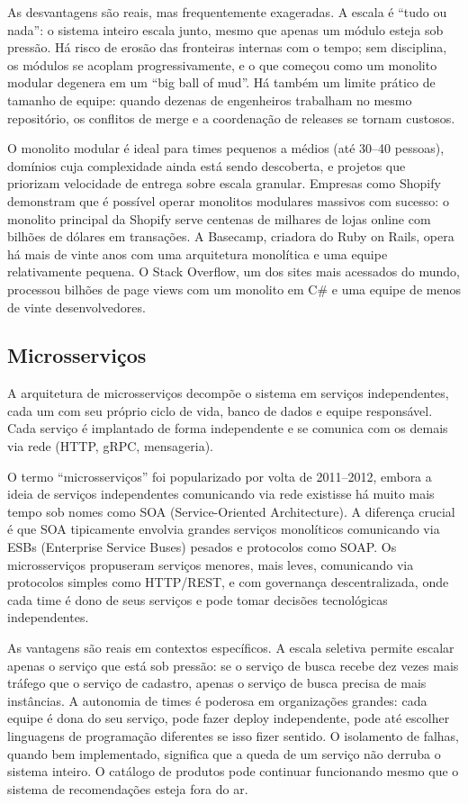 As desvantagens são reais, mas frequentemente exageradas. A escala é ``tudo
ou nada'': o sistema inteiro escala junto, mesmo que apenas um módulo esteja
sob pressão. Há risco de erosão das fronteiras internas com o tempo; sem
disciplina, os módulos se acoplam progressivamente, e o que começou como um
monolito modular degenera em um ``big ball of mud''. Há também um limite prático
de tamanho de equipe: quando dezenas de engenheiros trabalham no mesmo
repositório, os conflitos de merge e a coordenação de releases se tornam
custosos.

O monolito modular é ideal para times pequenos a médios (até 30--40 pessoas),
domínios cuja complexidade ainda está sendo descoberta, e projetos que priorizam
velocidade de entrega sobre escala granular. Empresas como Shopify demonstram
que é possível operar monolitos modulares massivos com sucesso: o monolito
principal da Shopify serve centenas de milhares de lojas online com bilhões
de dólares em transações. A Basecamp, criadora do Ruby on Rails, opera há
mais de vinte anos com uma arquitetura monolítica e uma equipe relativamente
pequena. O Stack Overflow, um dos sites mais acessados do mundo, processou
bilhões de page views com um monolito em C\# e uma equipe de menos de vinte
desenvolvedores.

\subsection{Microsserviços}

A arquitetura de microsserviços decompõe o sistema em serviços independentes, cada
um com seu próprio ciclo de vida, banco de dados e equipe responsável. Cada serviço
é implantado de forma independente e se comunica com os demais via rede (HTTP, gRPC,
mensageria).

O termo ``microsserviços'' foi popularizado por volta de 2011--2012, embora a
ideia de serviços independentes comunicando via rede existisse há muito mais
tempo sob nomes como SOA (Service-Oriented Architecture). A diferença crucial
é que SOA tipicamente envolvia grandes serviços monolíticos comunicando via
ESBs (Enterprise Service Buses) pesados e protocolos como SOAP. Os
microsserviços propuseram serviços menores, mais leves, comunicando via
protocolos simples como HTTP/REST, e com governança descentralizada, onde cada
time é dono de seus serviços e pode tomar decisões tecnológicas independentes.

As vantagens são reais em contextos específicos. A escala seletiva permite
escalar apenas o serviço que está sob pressão: se o serviço de busca recebe
dez vezes mais tráfego que o serviço de cadastro, apenas o serviço de busca
precisa de mais instâncias. A autonomia de times é poderosa em organizações
grandes: cada equipe é dona do seu serviço, pode fazer deploy independente,
pode até escolher linguagens de programação diferentes se isso fizer sentido.
O isolamento de falhas, quando bem implementado, significa que a queda de um
serviço não derruba o sistema inteiro. O catálogo de produtos pode continuar
funcionando mesmo que o sistema de recomendações esteja fora do ar.

